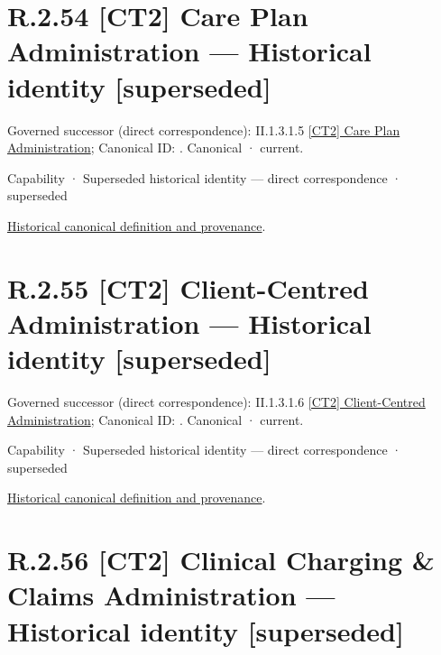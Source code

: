 \section*{R.2.54 [CT2] Care Plan Administration — Historical identity [superseded]}
\label{navigation:R.2.54}

{\small Governed successor (direct correspondence): II.1.3.1.5 \hyperref[element:cf06eec5699f406fa30a00d2f76e3098]{[CT2] Care Plan Administration}; Canonical ID: \texttt{}. Canonical · current.}\par
\label{element:e31407cea7624632a8ed2dc53b09d726}
{\small Capability · Superseded historical identity — direct correspondence · superseded}\par
\href{../../../../../../../continuum/strategy/capability/e31407cea7624632a8ed2dc53b09d726.md}{Historical canonical definition and provenance}.\par
\section*{R.2.55 [CT2] Client-Centred Administration — Historical identity [superseded]}
\label{navigation:R.2.55}

{\small Governed successor (direct correspondence): II.1.3.1.6 \hyperref[element:8752b7a937754b2faa296300c6a48911]{[CT2] Client-Centred Administration}; Canonical ID: \texttt{}. Canonical · current.}\par
\label{element:232b3fb2ff204c9b9ff7a60ff6a7a32d}
{\small Capability · Superseded historical identity — direct correspondence · superseded}\par
\href{../../../../../../../continuum/strategy/capability/232b3fb2ff204c9b9ff7a60ff6a7a32d.md}{Historical canonical definition and provenance}.\par
\section*{R.2.56 [CT2] Clinical Charging \& Claims Administration — Historical identity [superseded]}
\label{navigation:R.2.56}

